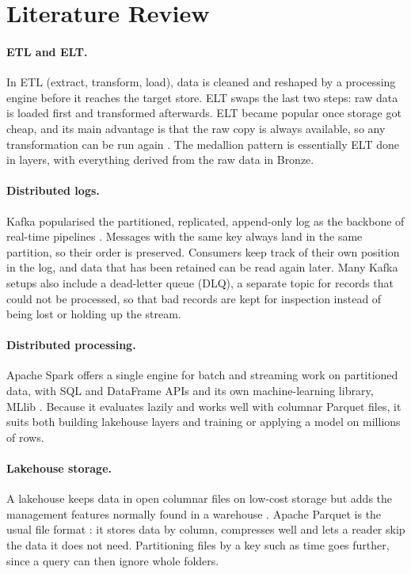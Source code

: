 \documentclass[11pt,a4paper]{article}
\begin{document}
\section{Literature Review}

\paragraph{ETL and ELT.} In ETL (extract, transform, load), data is cleaned and
reshaped by a processing engine before it reaches the target store. ELT swaps the
last two steps: raw data is loaded first and transformed afterwards. ELT became
popular once storage got cheap, and its main advantage is that the raw copy is
always available, so any transformation can be run again
\citep{kleppmann2017designing}. The medallion pattern is essentially ELT done in
layers, with everything derived from the raw data in Bronze.

\paragraph{Distributed logs.} Kafka popularised the partitioned, replicated,
append-only log as the backbone of real-time pipelines \citep{kreps2011kafka}.
Messages with the same key always land in the same partition, so their order is
preserved. Consumers keep track of their own position in the log, and data that
has been retained can be read again later. Many Kafka setups also include a
dead-letter queue (DLQ), a separate topic for records that could not be
processed, so that bad records are kept for inspection instead of being lost or
holding up the stream.

\paragraph{Distributed processing.} Apache Spark offers a single engine for batch
and streaming work on partitioned data, with SQL and DataFrame APIs and its own
machine-learning library, MLlib \citep{zaharia2016spark}. Because it evaluates
lazily and works well with columnar Parquet files, it suits both building
lakehouse layers and training or applying a model on millions of rows.

\paragraph{Lakehouse storage.} A lakehouse keeps data in open columnar files on
low-cost storage but adds the management features normally found in a warehouse
\citep{armbrust2021lakehouse}. Apache Parquet is the usual file format
\citep{parquet}: it stores data by column, compresses well and lets a reader skip
the data it does not need. Partitioning files by a key such as time goes further,
since a query can then ignore whole folders.
\end{document}
